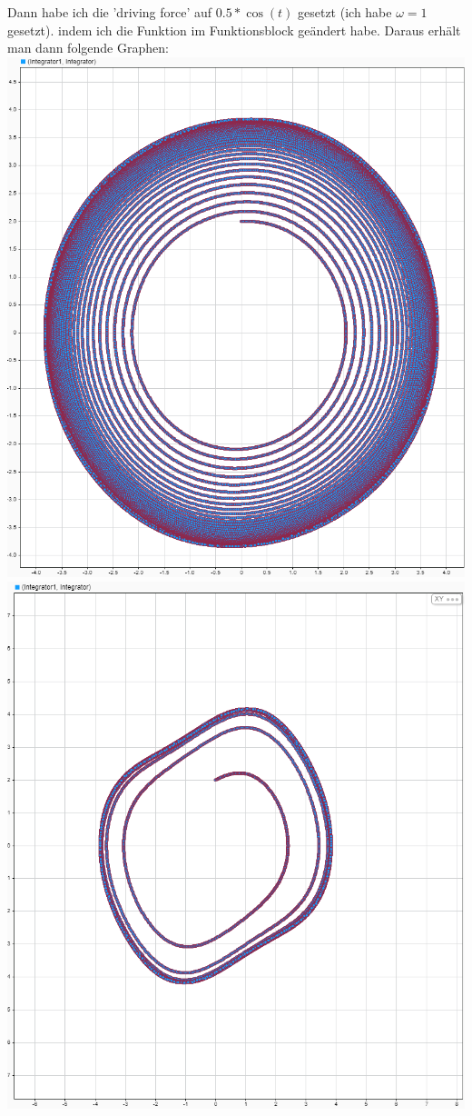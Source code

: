 \documentclass{scrartcl}
\begin{document}
Dann habe ich die 'driving force' auf $0.5*\cos(t)$ gesetzt (ich habe $\omega = 1$ gesetzt). indem ich die Funktion im Funktionsblock geändert habe. Daraus erhält man dann folgende Graphen:\\
\includegraphics[scale=0.3]{E4mu01v2.png}
\includegraphics[scale=0.3]{E4mu1v2.png}\\
\end{document}
